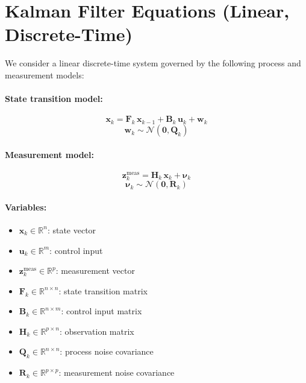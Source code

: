 \documentclass[11pt,letterpaper]{article}
\begin{document}
\section{Kalman Filter Equations (Linear, Discrete-Time)}

We consider a linear discrete-time system governed by the following process and measurement models:

\paragraph{State transition model:}
\begin{equation}
    \mathbf{x}_k = \mathbf{F}_k \, \mathbf{x}_{k-1} + \mathbf{B}_k \, \mathbf{u}_k + \mathbf{w}_k
\end{equation}
\begin{equation}
    \mathbf{w}_k \sim \mathcal{N}(\mathbf{0}, \mathbf{Q}_k)
\end{equation}

\paragraph{Measurement model:}
\begin{equation}
    \mathbf{z}^{\text{meas}}_k = \mathbf{H}_k \, \mathbf{x}_k + \boldsymbol{\nu}_k
\end{equation}
\begin{equation}
    \boldsymbol{\nu}_k \sim \mathcal{N}(\mathbf{0}, \mathbf{R}_k)
\end{equation}

\paragraph{Variables:}
\begin{itemize}
    \item \( \mathbf{x}_k \in \mathbb{R}^n \): state vector
    \item \( \mathbf{u}_k \in \mathbb{R}^m \): control input
    \item \( \mathbf{z}^{\text{meas}}_k \in \mathbb{R}^p \): measurement vector
    \item \( \mathbf{F}_k \in \mathbb{R}^{n \times n} \): state transition matrix
    \item \( \mathbf{B}_k \in \mathbb{R}^{n \times m} \): control input matrix
    \item \( \mathbf{H}_k \in \mathbb{R}^{p \times n} \): observation matrix
    \item \( \mathbf{Q}_k \in \mathbb{R}^{n \times n} \): process noise covariance
    \item \( \mathbf{R}_k \in \mathbb{R}^{p \times p} \): measurement noise covariance
\end{itemize}
\end{document}
